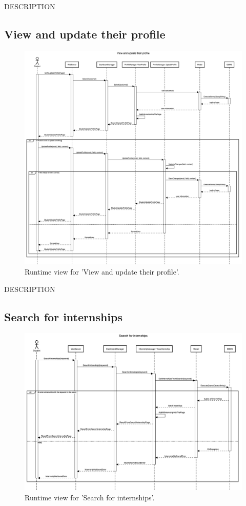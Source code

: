 DESCRIPTION


\subsection{View and update their profile}
\begin{figure}[H]
    \begin{center}
        \includegraphics[width=0.8\linewidth]{DD/LaTeX/Images/RuntimeView/ViewAndUpdateTheirProfile.png}
        \caption{Runtime view for 'View and update their profile'.}
        \label{fig:runtime_ViewAndUpdateTheirProfile}%
    \end{center}
\end{figure}

DESCRIPTION


\subsection{Search for internships}
\begin{figure}[H]
    \begin{center}
        \includegraphics[width=0.8\linewidth]{DD/LaTeX/Images/RuntimeView/SearchInternship.png}
        \caption{Runtime view for 'Search for internships'.}
        \label{fig:runtime_SearchInternship}%
    \end{center}
\end{figure}

